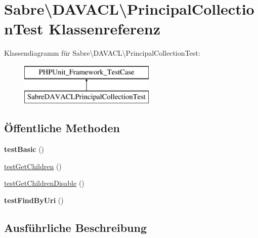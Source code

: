 \hypertarget{class_sabre_1_1_d_a_v_a_c_l_1_1_principal_collection_test}{}\section{Sabre\textbackslash{}D\+A\+V\+A\+CL\textbackslash{}Principal\+Collection\+Test Klassenreferenz}
\label{class_sabre_1_1_d_a_v_a_c_l_1_1_principal_collection_test}
Klassendiagramm für Sabre\textbackslash{}D\+A\+V\+A\+CL\textbackslash{}Principal\+Collection\+Test\+:\begin{figure}[H]
\begin{center}
\leavevmode
\includegraphics[height=2.000000cm]{class_sabre_1_1_d_a_v_a_c_l_1_1_principal_collection_test}
\end{center}
\end{figure}
\subsection*{Öffentliche Methoden}
\begin{DoxyCompactItemize}
\item 
\mbox{\label{class_sabre_1_1_d_a_v_a_c_l_1_1_principal_collection_test_a4c8fa5d63c13c7e51ecf3746b86d0008}} 
{\bfseries test\+Basic} ()
\item 
\mbox{\hyperlink{class_sabre_1_1_d_a_v_a_c_l_1_1_principal_collection_test_a488cf79236a03c0cf921a14e41475fff}{test\+Get\+Children}} ()
\item 
\mbox{\hyperlink{class_sabre_1_1_d_a_v_a_c_l_1_1_principal_collection_test_a63bb060a6a33a19e37f8c7b7858fa681}{test\+Get\+Children\+Disable}} ()
\item 
\mbox{\label{class_sabre_1_1_d_a_v_a_c_l_1_1_principal_collection_test_a7488890efea32f784707ebcad7d55ea3}} 
{\bfseries test\+Find\+By\+Uri} ()
\end{DoxyCompactItemize}


\subsection{Ausführliche Beschreibung}


